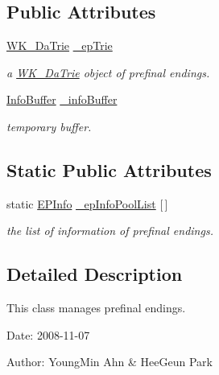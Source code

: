 \subsection*{Public Attributes}
\begin{CompactItemize}
\item 
\hyperlink{classkmaOrange_1_1WK__DaTrie}{WK\_\-DaTrie} \hyperlink{classkmaOrange_1_1PreFinalEomi_9e5980dd69c616faaec5fb08880f75cf}{\_\-epTrie}
\begin{CompactList}\small\item\em a \hyperlink{classkmaOrange_1_1WK__DaTrie}{WK\_\-DaTrie} object of prefinal endings. \item\end{CompactList}\item 
\hyperlink{classkmaOrange_1_1InfoBuffer}{InfoBuffer} \hyperlink{classkmaOrange_1_1PreFinalEomi_a9ab313b35d695007b75dcc6ed704cba}{\_\-infoBuffer}
\begin{CompactList}\small\item\em temporary buffer. \item\end{CompactList}\end{CompactItemize}
\subsection*{Static Public Attributes}
\begin{CompactItemize}
\item 
static \hyperlink{structkmaOrange_1_1EPInfo}{EPInfo} \hyperlink{classkmaOrange_1_1PreFinalEomi_46182b8344e9473063fb358b92b9c621}{\_\-epInfoPoolList} \mbox{[}$\,$\mbox{]}
\begin{CompactList}\small\item\em the list of information of prefinal endings. \item\end{CompactList}\end{CompactItemize}


\subsection{Detailed Description}
This class manages prefinal endings. 

\begin{Desc}
\item[Date:]2008-11-07 \end{Desc}
\begin{Desc}
\item[Author:]YoungMin Ahn \& HeeGeun Park \end{Desc}


